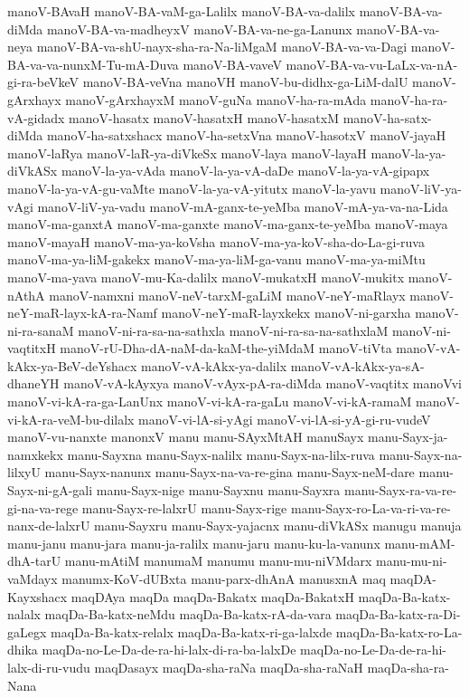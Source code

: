 {manoV-BAvaH
manoV-BA-vaM-ga-Lalilx
manoV-BA-va-dalilx
manoV-BA-va-diMda
manoV-BA-va-madheyxV
manoV-BA-va-ne-ga-Lanunx
manoV-BA-va-neya
manoV-BA-va-shU-nayx-sha-ra-Na-liMgaM
manoV-BA-va-va-Dagi
manoV-BA-va-va-nunxM-Tu-mA-Duva
manoV-BA-vaveV
manoV-BA-va-vu-LaLx-va-nA-gi-ra-beVkeV
manoV-BA-veVna
manoVH
manoV-bu-didhx-ga-LiM-dalU
manoV-gArxhayx
manoV-gArxhayxM
manoV-guNa
manoV-ha-ra-mAda
manoV-ha-ra-vA-gidadx
manoV-hasatx
manoV-hasatxH
manoV-hasatxM
manoV-ha-satx-diMda
manoV-ha-satxshacx
manoV-ha-setxVna
manoV-hasotxV
manoV-jayaH
manoV-laRya
manoV-laR-ya-diVkeSx
manoV-laya
manoV-layaH
manoV-la-ya-diVkASx
manoV-la-ya-vAda
manoV-la-ya-vA-daDe
manoV-la-ya-vA-gipapx
manoV-la-ya-vA-gu-vaMte
manoV-la-ya-vA-yitutx
manoV-la-yavu
manoV-liV-ya-vAgi
manoV-liV-ya-vadu
manoV-mA-ganx-te-yeMba
manoV-mA-ya-va-na-Lida
manoV-ma-ganxtA
manoV-ma-ganxte
manoV-ma-ganx-te-yeMba
manoV-maya
manoV-mayaH
manoV-ma-ya-koVsha
manoV-ma-ya-koV-sha-do-La-gi-ruva
manoV-ma-ya-liM-gakekx
manoV-ma-ya-liM-ga-vanu
manoV-ma-ya-miMtu
manoV-ma-yava
manoV-mu-Ka-dalilx
manoV-mukatxH
manoV-mukitx
manoV-nAthA
manoV-namxni
manoV-neV-tarxM-gaLiM
manoV-neY-maRlayx
manoV-neY-maR-layx-kA-ra-Namf
manoV-neY-maR-layxkekx
manoV-ni-garxha
manoV-ni-ra-sanaM
manoV-ni-ra-sa-na-sathxla
manoV-ni-ra-sa-na-sathxlaM
manoV-ni-vaqtitxH
manoV-rU-Dha-dA-naM-da-kaM-the-yiMdaM
manoV-tiVta
manoV-vA-kAkx-ya-BeV-deYshacx
manoV-vA-kAkx-ya-dalilx
manoV-vA-kAkx-ya-sA-dhaneYH
manoV-vA-kAyxya
manoV-vAyx-pA-ra-diMda
manoV-vaqtitx
manoVvi
manoV-vi-kA-ra-ga-LanUnx
manoV-vi-kA-ra-gaLu
manoV-vi-kA-ramaM
manoV-vi-kA-ra-veM-bu-dilalx
manoV-vi-lA-si-yAgi
manoV-vi-lA-si-yA-gi-ru-vudeV
manoV-vu-nanxte
manonxV
manu
manu-SAyxMtAH
manuSayx
manu-Sayx-ja-namxkekx
manu-Sayxna
manu-Sayx-nalilx
manu-Sayx-na-lilx-ruva
manu-Sayx-na-lilxyU
manu-Sayx-nanunx
manu-Sayx-na-va-re-gina
manu-Sayx-neM-dare
manu-Sayx-ni-gA-gali
manu-Sayx-nige
manu-Sayxnu
manu-Sayxra
manu-Sayx-ra-va-re-gi-na-va-rege
manu-Sayx-re-lalxrU
manu-Sayx-rige
manu-Sayx-ro-La-va-ri-va-re-nanx-de-lalxrU
manu-Sayxru
manu-Sayx-yajacnx
manu-diVkASx
manugu
manuja
manu-janu
manu-jara
manu-ja-ralilx
manu-jaru
manu-ku-la-vanunx
manu-mAM-dhA-tarU
manu-mAtiM
manumaM
manumu
manu-mu-niVMdarx
manu-mu-ni-vaMdayx
manumx-KoV-dUBxta
manu-parx-dhAnA
manusxnA
maq
maqDA-Kayxshacx
maqDAya
maqDa
maqDa-Bakatx
maqDa-BakatxH
maqDa-Ba-katx-nalalx
maqDa-Ba-katx-neMdu
maqDa-Ba-katx-rA-da-vara
maqDa-Ba-katx-ra-Di-gaLegx
maqDa-Ba-katx-relalx
maqDa-Ba-katx-ri-ga-lalxde
maqDa-Ba-katx-ro-La-dhika
maqDa-no-Le-Da-de-ra-hi-lalx-di-ra-ba-lalxDe
maqDa-no-Le-Da-de-ra-hi-lalx-di-ru-vudu
maqDasayx
maqDa-sha-raNa
maqDa-sha-raNaH
maqDa-sha-ra-Nana
}
